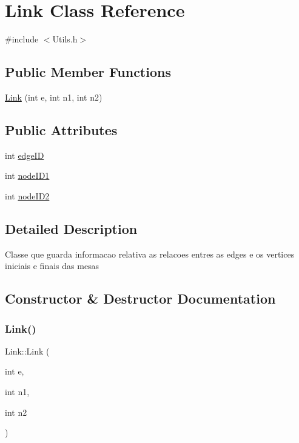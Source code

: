 \hypertarget{class_link}{}\section{Link Class Reference}
\label{class_link}


{\ttfamily \#include $<$Utils.\+h$>$}

\subsection*{Public Member Functions}
\begin{DoxyCompactItemize}
\item 
\mbox{\hyperlink{class_link_a982a39ac15c2fcaa510c0b5a54f07da8}{Link}} (int e, int n1, int n2)
\end{DoxyCompactItemize}
\subsection*{Public Attributes}
\begin{DoxyCompactItemize}
\item 
int \mbox{\hyperlink{class_link_a3f43504b7c06e27ec9eb8f724b1fd1fe}{edge\+ID}}
\item 
int \mbox{\hyperlink{class_link_ac032a7209d3ef89f093c6056bd20b524}{node\+I\+D1}}
\item 
int \mbox{\hyperlink{class_link_a681c549c9ce365d7ab61267f2d66fc66}{node\+I\+D2}}
\end{DoxyCompactItemize}


\subsection{Detailed Description}
Classe que guarda informacao relativa as relacoes entres as edges e os vertices iniciais e finais das mesas 

\subsection{Constructor \& Destructor Documentation}
\mbox{\label{class_link_a982a39ac15c2fcaa510c0b5a54f07da8}} 
\subsubsection{\texorpdfstring{Link()}{Link()}}
{\footnotesize\ttfamily Link\+::\+Link (\begin{DoxyParamCaption}\item[{int}]{e,  }\item[{int}]{n1,  }\item[{int}]{n2 }\end{DoxyParamCaption})\hspace{0.3cm}{\ttfamily [inline]}}


